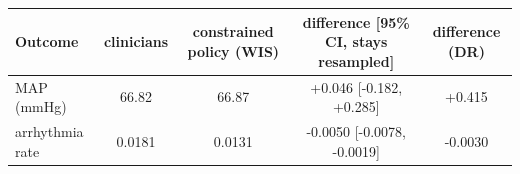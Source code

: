 \begin{tabular}{lcccc}
\toprule
Outcome & clinicians & constrained policy (WIS) & difference [95\% CI, stays resampled] & difference (DR) \\
\midrule
MAP (mmHg) & 66.82 & 66.87 & +0.046 [-0.182, +0.285] & +0.415 \\
arrhythmia rate & 0.0181 & 0.0131 & -0.0050 [-0.0078, -0.0019] & -0.0030 \\
\bottomrule
\end{tabular}
